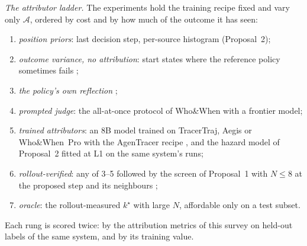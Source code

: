 \documentclass[10pt,a4paper]{article}
\begin{document}
\emph{The attributor ladder.} The experiments hold the training recipe fixed and vary only $\mathcal{A}$, ordered by cost and by how much of the outcome it has seen:
\begin{enumerate}[leftmargin=1.4em,itemsep=1pt]
\item \emph{position priors}: last decision step, per-source histogram (Proposal~2);
\item \emph{outcome variance, no attribution}: start states where the reference policy sometimes fails \cite{pivotrl2026};
\item \emph{the policy's own reflection} \cite{guo2026pivoarl};
\item \emph{prompted judge}: the all-at-once protocol of Who\&When with a frontier model;
\item \emph{trained attributors}: an 8B model trained on TracerTraj, Aegis or Who\&When~Pro with the AgenTracer recipe \cite{agentracer2026}, and the hazard model of Proposal~2 fitted at L1 on the same system's runs;
\item \emph{rollout-verified}: any of 3--5 followed by the screen of Proposal~1 with $N\le8$ at the proposed step and its neighbours \cite{liang2026elpo,jung2026prover};
\item \emph{oracle}: the rollout-measured $k^\star$ with large $N$, affordable only on a test subset.
\end{enumerate}
Each rung is scored twice: by the attribution metrics of this survey on held-out labels of the same system, and by its training value.
\end{document}
